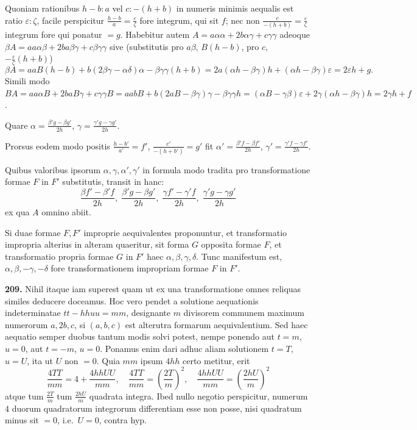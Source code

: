 \documentclass[12pt,a4paper]{article}
\theoremstyle{plain}
\theoremstyle{definition}
\theoremstyle{remark}
\begin{document}
Quoniam rationibus $h-b:a$ vel $c:-(h+b)$ in numeris minimis aequalis est ratio $\varepsilon:\zeta$, facile perspicitur $\frac{h-b}{a}=\frac{\varepsilon}{\zeta}$ fore integrum, qui sit $f$; nec non $\frac{c}{-(h+b)}=\frac{\varepsilon}{\zeta}$ integrum fore qui ponatur $=g$. Habebitur autem $A=a\alpha\alpha+2b\alpha\gamma+c\gamma\gamma$ adeoque $\beta A=aa\alpha\beta+2ba\beta\gamma+c\beta\gamma\gamma$ sive (substitutis pro $a\beta$, $B(h-b)$, pro $c$, $-\frac{\varepsilon}{\zeta}(h+b)$)
\[
\beta A=aaB(h-b)+b(2\beta\gamma-\alpha\delta)\alpha-\beta\gamma\gamma(h+b)=2a(\alpha h-\beta\gamma)h+(\alpha h-\beta\gamma)\varepsilon=2\varepsilon h+g.
\]
Simili modo $BA=aa\alpha B+2baB\gamma+c\gamma\gamma B=aabB+b(2aB-\beta\gamma)\gamma-\beta\gamma\gamma h=(\alpha B-\gamma\beta)\varepsilon+2\gamma(\alpha h-\beta\gamma)h=2\gamma h+f$.

Quare $\alpha=\frac{\beta'g-\beta g'}{2h}$, $\gamma=\frac{\gamma'g-\gamma g'}{2h}$.

Prorsus eodem modo positis $\frac{h-b'}{a'}=f'$, $\frac{c'}{-(h+b')}=g'$ fit $\alpha'=\frac{\beta'f-\beta f'}{2h}$, $\gamma'=\frac{\gamma'f-\gamma f'}{2h}$.

Quibus valoribus ipsorum $\alpha,\gamma,\alpha',\gamma'$ in formula modo tradita pro transformatione formae $F$ in $F'$ substitutis, transit in hanc:
\[
\frac{\beta f'-\beta' f}{2h},\; \frac{\beta'g-\beta g'}{2h},\; \frac{\gamma f'-\gamma' f}{2h},\; \frac{\gamma'g-\gamma g'}{2h}
\]
ex qua $A$ omnino abiit.

Si duae formae $F,F'$ improprie aequivalentes proponuntur, et transformatio impropria alterius in alteram quaeritur, sit forma $G$ opposita formae $F$, et transformatio propria formae $G$ in $F'$ haec $\alpha,\beta,\gamma,\delta$. Tunc manifestum est, $\alpha,\beta,-\gamma,-\delta$ fore transformationem impropriam formae $F$ in $F'$.

\textbf{209.}
Nihil itaque iam superest quam ut ex una transformatione omnes reliquas similes deducere doceamus. Hoc vero pendet a solutione aequationis indeterminatae $tt-hhuu=mm$, designante $m$ divisorem communem maximum numerorum $a,2b,c$, si $(a,b,c)$ est alterutra formarum aequivalentium. Sed haec aequatio semper duobus tantum modis solvi potest, nempe ponendo aut $t=m$, $u=0$, aut $t=-m$, $u=0$. Ponamus enim dari adhuc aliam solutionem $t=T$, $u=U$, ita ut $U$ non $=0$. Quia $mm$ ipsum $4hh$ certo metitur, erit
\[
\frac{4TT}{mm}=4+\frac{4hhUU}{mm},\quad \frac{4TT}{mm}=\left(\frac{2T}{m}\right)^2,\quad \frac{4hhUU}{mm}=\left(\frac{2hU}{m}\right)^2
\]
atque tum $\frac{2T}{m}$ tum $\frac{2hU}{m}$ quadrata integra. Ibed nullo negotio perspicitur, numerum $4$ duorum quadratorum integrorum differentiam esse non posse, nisi quadratum minus sit $=0$, i.e.\ $U=0$, contra hyp.
\end{document}
